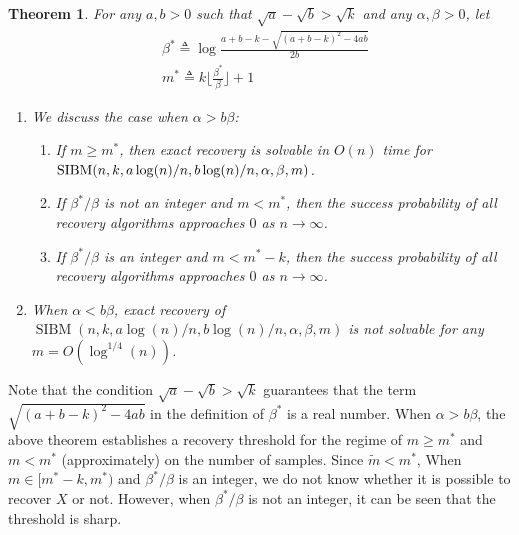 \label{key}\documentclass[conference]{IEEEtran}
\newtheorem{theorem}{Theorem}%
\DeclareMathOperator{\SIBM}{SIBM}
\begin{document}
\begin{theorem} \label{thm:wt1}
For any $a,b> 0$ such that $\sqrt{a}-\sqrt{b}> \sqrt{k}$ and any $\alpha,\beta>0$, let
\begin{align} \label{eq:defstar}
&\beta^\ast \triangleq
\log\frac{a+b-k-\sqrt{(a+b-k)^2-4ab}}{2 b}  \\
&m^\ast \triangleq k \Big\lfloor \frac{\beta^\ast}{\beta} \Big\rfloor +1 
\end{align}
\begin{enumerate}
	\item We discuss the case when $\alpha > b \beta$:
	\begin{enumerate}
	\item If $m\ge m^\ast$, then exact recovery is solvable in $O(n)$ time for $\SIBM(n,k, a\log(n)/n, \linebreak[4] b\log(n)/n,\alpha,\beta,m)$.
	\item If $\beta^\ast/\beta$ is not an integer and $m < m^\ast$, then the success probability of all recovery algorithms approaches $0$ as $n\to\infty$.
	\item If $\beta^\ast/\beta$ is an integer and $m < m^\ast - k$, then the success probability of all recovery algorithms approaches $0$ as $n\to\infty$.
	\end{enumerate}
	\item When $\alpha < b \beta$, exact recovery of $\SIBM(n,k, a\log(n)/n, b\log(n)/n,\alpha,\beta,m)$ is not solvable for any $m=O(\log^{1/4}(n))$.
\end{enumerate}

\end{theorem}
Note that the condition $\sqrt{a}-\sqrt{b} > \sqrt{k}$ guarantees that the term $\sqrt{(a+b-k)^2-4ab}$ in the definition of $\beta^\ast$ is a real number.
When $\alpha > b \beta$,
the above theorem establishes a recovery threshold
for the regime of $m \geq m^\ast$ and $m < m^\ast$ (approximately) on the number of samples. Since $\tilde{m} < m^*$,
When $m \in [m^* - k, m^\ast)$ and $\beta^\ast/\beta$ is an integer, we do not know whether it is possible to recover $X$ or not.
However, when $\beta^\ast/\beta$ is not an integer, it can be seen that the threshold is sharp.
\end{document}
